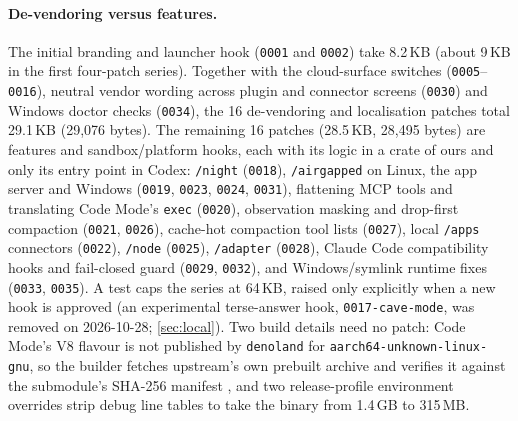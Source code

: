 \documentclass[11pt]{article}
\newcommand{\code}[1]{\texttt{#1}}
\begin{document}
\paragraph{De-vendoring versus features.} The initial branding and launcher hook (\code{0001} and
\code{0002}) take 8.2\,KB (about 9\,KB in the first four-patch series). Together with the
cloud-surface switches (\code{0005}--\code{0016}), neutral vendor wording across plugin and
connector screens (\code{0030}) and Windows doctor checks (\code{0034}), the 16 de-vendoring and
localisation patches total 29.1\,KB (29{,}076 bytes). The remaining 16 patches (28.5\,KB, 28{,}495
bytes) are features and sandbox/platform hooks, each with its logic in a crate of ours and only its
entry point in Codex: \code{/night} (\code{0018}), \code{/airgapped} on Linux, the app server and
Windows (\code{0019}, \code{0023}, \code{0024}, \code{0031}), flattening MCP tools and translating
Code Mode's \code{exec} (\code{0020}), observation masking and drop-first compaction (\code{0021},
\code{0026}), cache-hot compaction tool lists (\code{0027}), local \code{/apps} connectors
(\code{0022}), \code{/node} (\code{0025}), \code{/adapter} (\code{0028}), Claude Code
compatibility hooks and fail-closed guard (\code{0029}, \code{0032}), and Windows/symlink runtime
fixes (\code{0033}, \code{0035}). A test caps the series at 64\,KB, raised only explicitly when a
new hook is approved (an experimental terse-answer hook, \code{0017-cave-mode}, was removed on
2026-10-28; \cref{sec:local}). Two build details need no patch: Code Mode's V8 flavour is not
published by \code{denoland} for \code{aarch64-unknown-linux-gnu}, so the builder fetches
upstream's own prebuilt archive and verifies it against the submodule's SHA-256 manifest
\cite{rustyv8}, and two release-profile environment overrides strip debug line tables to take the
binary from 1.4\,GB to 315\,MB.
\end{document}
